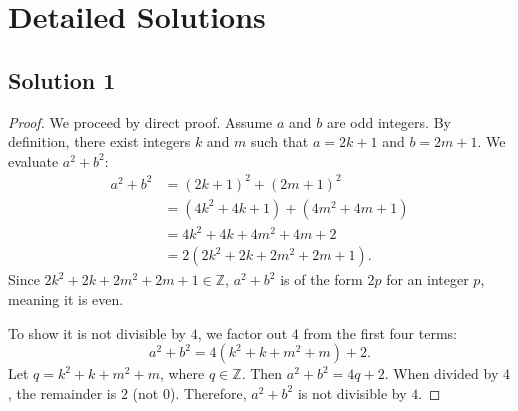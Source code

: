 \documentclass[11pt]{article}
\begin{document}
\newpage

\section{Detailed Solutions}

\subsection{Solution 1}
\begin{proof}
We proceed by direct proof. Assume $a$ and $b$ are odd integers. By definition, there exist integers $k$ and $m$ such that $a = 2k + 1$ and $b = 2m + 1$. We evaluate $a^2 + b^2$:
\begin{align*}
a^2 + b^2 &= (2k + 1)^2 + (2m + 1)^2 \\
&= (4k^2 + 4k + 1) + (4m^2 + 4m + 1) \\
&= 4k^2 + 4k + 4m^2 + 4m + 2 \\
&= 2(2k^2 + 2k + 2m^2 + 2m + 1).
\end{align*}
Since $2k^2 + 2k + 2m^2 + 2m + 1 \in \mathbb{Z}$, $a^2 + b^2$ is of the form $2p$ for an integer $p$, meaning it is even. 

To show it is not divisible by $4$, we factor out $4$ from the first four terms:
\[ a^2 + b^2 = 4(k^2 + k + m^2 + m) + 2. \]
Let $q = k^2 + k + m^2 + m$, where $q \in \mathbb{Z}$. Then $a^2 + b^2 = 4q + 2$. When divided by $4$, the remainder is $2$ (not $0$). Therefore, $a^2 + b^2$ is not divisible by $4$.
\end{proof}
\end{document}
